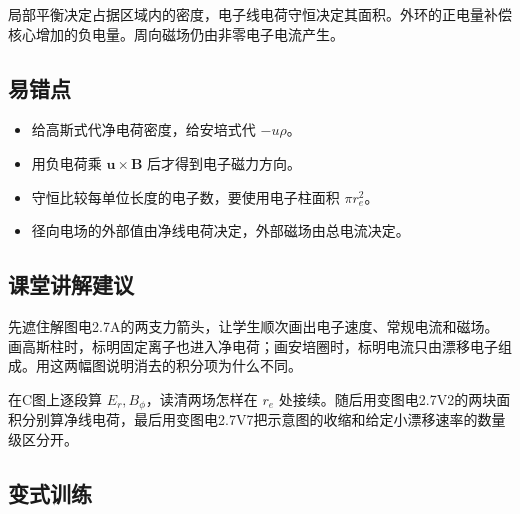 \documentclass[UTF8,fontset=fandol,a4paper,11pt]{ctexart}
\newcommand{\vect}[1]{\bm{#1}}
\begin{document}
局部平衡决定占据区域内的密度，电子线电荷守恒决定其面积。外环的正电量补偿核心增加的负电量。周向磁场仍由非零电子电流产生。



\subsection*{易错点}

\begin{itemize}
\item 给高斯式代净电荷密度，给安培式代 $-u\rho$。
\item 用负电荷乘 $\vect u\times\vect B$ 后才得到电子磁力方向。
\item 守恒比较每单位长度的电子数，要使用电子柱面积 $\pi r_e^2$。
\item 径向电场的外部值由净线电荷决定，外部磁场由总电流决定。
\end{itemize}



\subsection*{课堂讲解建议}

先遮住解图电2.7A的两支力箭头，让学生顺次画出电子速度、常规电流和磁场。画高斯柱时，标明固定离子也进入净电荷；画安培圈时，标明电流只由漂移电子组成。用这两幅图说明消去的积分项为什么不同。

在C图上逐段算 $E_r,B_\phi$，读清两场怎样在 $r_e$ 处接续。随后用变图电2.7V2的两块面积分别算净线电荷，最后用变图电2.7V7把示意图的收缩和给定小漂移速率的数量级区分开。


\subsection*{变式训练}
\end{document}
